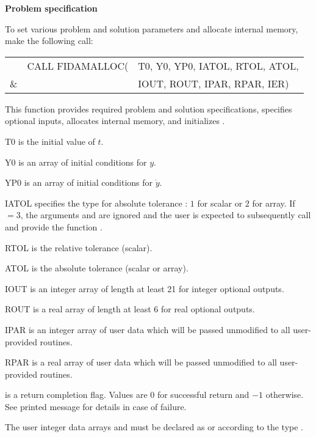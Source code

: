 \begin{Steps}
\item {\bf Problem specification}

  To set various problem and solution parameters and allocate
  internal memory, make the following call:
  {
    \begin{tabular}[t]{@{}r@{}l@{}l}
        &CALL FIDAMALLOC(&T0, Y0, YP0, IATOL, RTOL, ATOL,  \\
    {\&}&                &IOUT, ROUT, IPAR, RPAR, IER)
  \end{tabular}
  }
  {
    This function provides required problem and solution specifications,
    specifies optional inputs,
    allocates internal memory, and initializes {\ida}.
  }
  {
    \begin{args}[IATOL]
    \item[T0] is the initial value of $t$.
    \item[Y0] is an array of initial conditions for $y$.
    \item[YP0] is an array of initial conditions for $\dot{y}$.
    \item[IATOL] specifies the type for absolute tolerance :
      $1$ for scalar or $2$ for array. If $=3$, the arguments
       and  are ignored and the user is expected to
      subsequently call  and provide the function .
    \item[RTOL] is the relative tolerance (scalar).
    \item[ATOL] is the absolute tolerance (scalar or array).
    \item[IOUT] is an integer array of length at least 21 for integer optional
                outputs.
    \item[ROUT] is a real array of length at least 6 for real optional outputs.
    \item[IPAR] is an integer array of user data which will be passed
      unmodified to all user-provided routines.
    \item[RPAR] is a real array of user data which will be passed
      unmodified to all user-provided routines.
    \end{args}
  }
  {
     is a return completion flag.  Values are $0$ for successful return
    and $-1$ otherwise. See printed message for details in case of failure.
  }
  {
    The user integer data arrays  and  must be declared as
     or  according to the {\CC} type .

}
\end{Steps}
